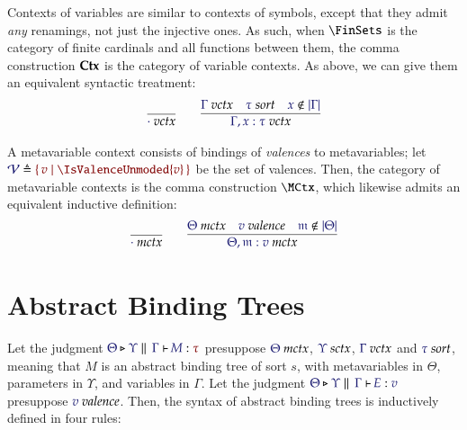 \documentclass[11pt]{article}
\theoremstyle{definition}
\theoremstyle{remark}
\numberwithin{equation}{section}
\begin{document}
Contexts of variables are similar to contexts of symbols, except that they
admit \emph{any} renamings, not just the injective ones. As such, when
$\FinSets$ is the category of finite cardinals and all functions between them, the
comma construction $\mathbf{Ctx}$ is the category of variable contexts. As above, we
can give them an equivalent syntactic treatment:
\begin{gather*}
  \infer{
    \IsVarCtx{\cdot}
  }{
  }
\qquad
  \infer{
    \IsVarCtx{\Gamma,x:\tau}
  }{
    \IsVarCtx{\Gamma}
&
    \IsSort{\tau}
&
    \NotIn{x}{\Dom\Gamma}
  }
\end{gather*}

A metavariable context consists of bindings of \emph{valences} to
metavariables; let $\Define{\Valences}{\MkSet{v\mid \IsValenceUnmoded{v}}}$ be the set
of valences. Then, the category of metavariable contexts is the comma
construction $\MCtx$, which likewise admits an equivalent inductive definition:
\begin{gather*}
  \infer{
    \IsMetaCtx{\cdot}
  }{
  }
\qquad
  \infer{
    \IsMetaCtx{\Theta,\MV{m}:v}
  }{
    \IsMetaCtx{\Theta}
&
    \IsValence{v}
&
    \NotIn{\MV{m}}{\Dom\Theta}
  }
\end{gather*}



\section{Abstract Binding Trees}

Let the judgment $\IsAbt{\Theta}{\Upsilon}{\Gamma}{M}{\tau}$ presuppose
$\IsMetaCtx{\Theta}$, $\IsSymCtx\Upsilon$, $\IsVarCtx\Gamma$ and
$\IsSort{\tau}$, meaning that $M$ is an abstract binding tree of sort $s$, with
metavariables in $\Theta$, parameters in $\Upsilon$, and variables in $\Gamma$.
Let the judgment $\IsBTm{\Theta}{\Upsilon}{\Gamma}{E}{v}$ presuppose
$\IsValence{v}$. Then, the syntax of abstract binding trees is inductively
defined in four rules:
\end{document}
